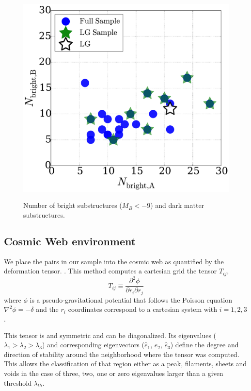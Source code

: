 \documentclass{emulateapj}
\begin{document}
\begin{figure}
\centering
\includegraphics[width=\hsize]{n_structure.pdf}\\
\caption{Number of bright substructures ($M_{B}<-9$) and dark matter
  substructures.}
\label{fig:nstructure}
\end{figure}


\subsection{Cosmic Web environment}
We place the pairs in our sample into the cosmic web as quantified by
the deformation tensor.
\citep{2007MNRAS.375..489H,2009MNRAS.396.1815F}.
This method computes a cartesian grid the tensor $T_{ij}$,
\begin{equation}
T_{ij} \equiv \frac{\partial^2\phi}{\partial r_i \partial r_j}
\end{equation}
%
where $\phi$ is a pseudo-gravitational potential that follows the
Poisson equation $\nabla^2\phi=-\delta$ and the $r_i$ coordinates
correspond to a cartesian system with $i=1,2,3$. 

This tensor is and symmetric and can be diagonalized.
Its eigenvalues ($\lambda_1 > \lambda_2 > \lambda_3$) and
corresponding eigenvectors ($\hat{e}_1$, $\hat{e}_2$, $\hat{e}_3$)
define the degree and direction of stability around the neighborhood
where the tensor was computed. 
This allows the classification of that region either as a peak,
filaments, sheets and voids in the case of three, two, one or zero
eigenvalues larger than a given threshold $\lambda_{th}$.
\end{document}

